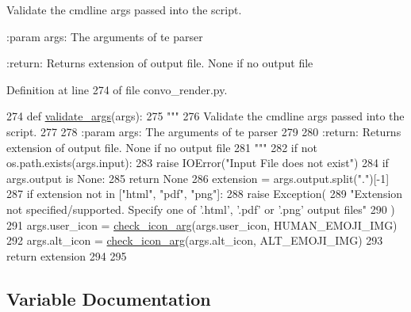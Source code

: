\begin{DoxyVerb}Validate the cmdline args passed into the script.

:param args: The arguments of te parser

:return: Returns extension of output file. None if no output file
\end{DoxyVerb}
 

Definition at line 274 of file convo\+\_\+render.\+py.


\begin{DoxyCode}
274 \textcolor{keyword}{def }\hyperlink{namespaceparlai_1_1scripts_1_1convo__render_a4078a037f4f5526297e7860fbed9cfb2}{validate\_args}(args):
275     \textcolor{stringliteral}{"""}
276 \textcolor{stringliteral}{    Validate the cmdline args passed into the script.}
277 \textcolor{stringliteral}{}
278 \textcolor{stringliteral}{    :param args: The arguments of te parser}
279 \textcolor{stringliteral}{}
280 \textcolor{stringliteral}{    :return: Returns extension of output file. None if no output file}
281 \textcolor{stringliteral}{    """}
282     \textcolor{keywordflow}{if} \textcolor{keywordflow}{not} os.path.exists(args.input):
283         \textcolor{keywordflow}{raise} IOError(\textcolor{stringliteral}{"Input File does not exist"})
284     \textcolor{keywordflow}{if} args.output \textcolor{keywordflow}{is} \textcolor{keywordtype}{None}:
285         \textcolor{keywordflow}{return} \textcolor{keywordtype}{None}
286     extension = args.output.split(\textcolor{stringliteral}{"."})[-1]
287     \textcolor{keywordflow}{if} extension \textcolor{keywordflow}{not} \textcolor{keywordflow}{in} [\textcolor{stringliteral}{"html"}, \textcolor{stringliteral}{"pdf"}, \textcolor{stringliteral}{"png"}]:
288         \textcolor{keywordflow}{raise} Exception(
289             \textcolor{stringliteral}{"Extension not specified/supported. Specify one of '.html', '.pdf' or '.png' output files"}
290         )
291     args.user\_icon = \hyperlink{namespaceparlai_1_1scripts_1_1convo__render_ac7e3c84a7f6e3b488360319b597eda18}{check\_icon\_arg}(args.user\_icon, HUMAN\_EMOJI\_IMG)
292     args.alt\_icon = \hyperlink{namespaceparlai_1_1scripts_1_1convo__render_ac7e3c84a7f6e3b488360319b597eda18}{check\_icon\_arg}(args.alt\_icon, ALT\_EMOJI\_IMG)
293     \textcolor{keywordflow}{return} extension
294 
295 
\end{DoxyCode}


\subsection{Variable Documentation}
\mbox{\label{namespaceparlai_1_1scripts_1_1convo__render_a857bb24c69ad3368ee6d8d1f3f389420}} 
